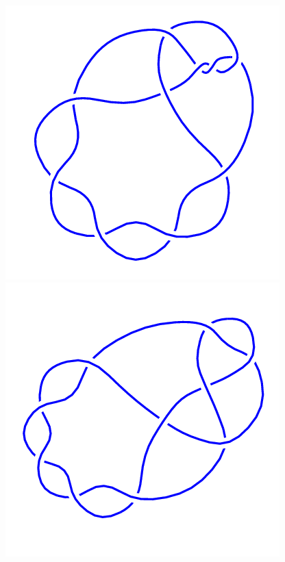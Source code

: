 \begin{figure}[H]
\begin{minipage}[b]{.18\linewidth}
    \end{minipage}
    \begin{minipage}[b]{.18\linewidth}
        \centering
        \includegraphics[width=\linewidth]{../data/10_9.png}
    \end{minipage}
    \begin{minipage}[b]{.18\linewidth}
        \centering
        \includegraphics[width=\linewidth]{../data/10_10.png}

\end{minipage}
\end{figure}
